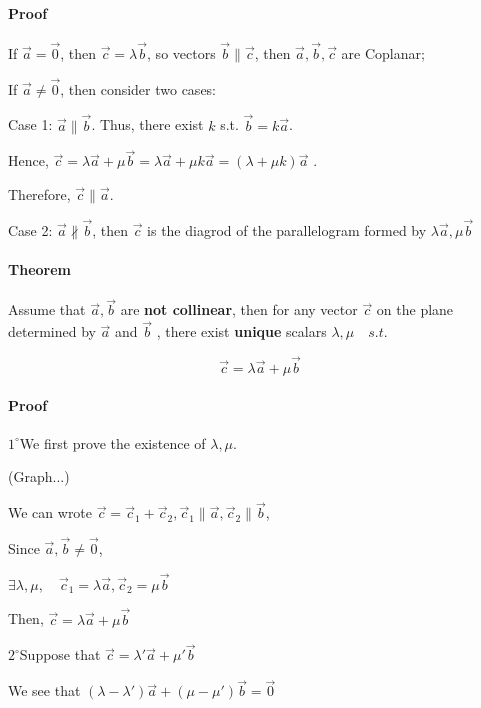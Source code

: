 \documentclass[11pt]{book}
\begin{document}
\paragraph{Proof}

If $\vec a  = \vec 0$, then $\vec c = \lambda \vec  b$, so vectors $\vec  b \parallel \vec  c$, then $\vec  a, \vec  b, \vec  c $ are Coplanar;

If $\vec  a \neq \vec  0 $, then consider two cases:

Case 1: $\vec  a \parallel \vec  b$. Thus, there exist $k$ s.t. $\vec  b = k \vec  a $. 

Hence, $\vec  c = \lambda \vec  a + \mu \vec  b = \lambda \vec  a +\mu k \vec  a  = (\lambda + \mu k ) \vec  a $ .

Therefore, $\vec c \parallel \vec  a$. 

Case 2: $\vec  a \not \parallel \vec  b$, then $\vec  c$ is the diagrod of the parallelogram formed by $\lambda \vec  a, \mu \vec  b$

\paragraph{Theorem}

Assume that $\vec a, \vec b $ are \textbf{not collinear}, then for any vector $\vec c $  on the plane determined by $\vec a$ and $\vec b $ , there exist \textbf{unique} scalars $\lambda , \mu \quad s.t. \quad $


$$
\vec c = \lambda \vec a + \mu \vec b
$$

\paragraph{Proof}

$1^{\circ}$We first prove the existence of $\lambda, \mu $. 

(Graph...)

We can wrote $\vec c = \vec  c_1+ \vec  c_2, \vec c_1 \parallel \vec a, \vec c_2 \parallel \vec  b$, 

Since $\vec a,\vec  b \neq \vec  0$, 

$\exists \lambda,\mu,\quad \vec c_1 = \lambda \vec a, \vec c_2 = \mu \vec b$

Then, $\vec c = \lambda \vec  a+\mu \vec  b$

$2^{\circ}$Suppose that $\vec c = \lambda ' \vec  a+\mu '\vec  b $

We see that $(\lambda - \lambda ')\vec  a +(\mu - \mu ')\vec b  = \vec  0$
\end{document}
